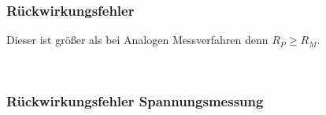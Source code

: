 \subsubsection{Rückwirkungsfehler} 
Dieser ist größer als bei Analogen Messverfahren denn $R_P \ge R_M$.

\begin{minipage}{0.45\textwidth} 
 \\
\end{minipage} 
\begin{minipage}{0.45\textwidth} 
 
\end{minipage}

\subsubsection{Rückwirkungsfehler Spannungsmessung} 
\begin{minipage}{0.45\textwidth} 
 \\
\end{minipage} 
\begin{minipage}{0.45\textwidth} 
 
\end{minipage}
